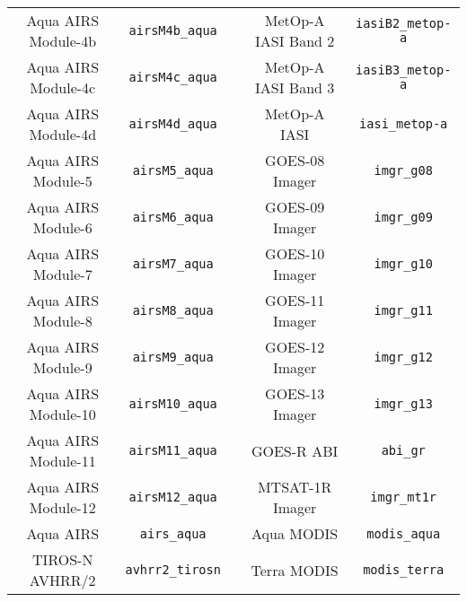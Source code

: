 \begin{table}[htp]
\begin{tabular}{c c c c c}
Aqua AIRS Module-4b & \texttt{airsM4b\_aqua}       & \hspace{0.2cm} & MetOp-A IASI Band 2 & \texttt{iasiB2\_metop-a}            \\
Aqua AIRS Module-4c & \texttt{airsM4c\_aqua}       & \hspace{0.2cm} & MetOp-A IASI Band 3 & \texttt{iasiB3\_metop-a}            \\
Aqua AIRS Module-4d & \texttt{airsM4d\_aqua}       & \hspace{0.2cm} & MetOp-A IASI & \texttt{iasi\_metop-a}                     \\
Aqua AIRS Module-5  & \texttt{airsM5\_aqua}        & \hspace{0.2cm} & GOES-08 Imager & \texttt{imgr\_g08}                       \\
Aqua AIRS Module-6  & \texttt{airsM6\_aqua}        & \hspace{0.2cm} & GOES-09 Imager & \texttt{imgr\_g09}                       \\
Aqua AIRS Module-7  & \texttt{airsM7\_aqua}        & \hspace{0.2cm} & GOES-10 Imager & \texttt{imgr\_g10}                       \\
Aqua AIRS Module-8  & \texttt{airsM8\_aqua}        & \hspace{0.2cm} & GOES-11 Imager & \texttt{imgr\_g11}                       \\
Aqua AIRS Module-9  & \texttt{airsM9\_aqua}        & \hspace{0.2cm} & GOES-12 Imager & \texttt{imgr\_g12}                       \\
Aqua AIRS Module-10 & \texttt{airsM10\_aqua}       & \hspace{0.2cm} & GOES-13 Imager & \texttt{imgr\_g13}                       \\
Aqua AIRS Module-11 & \texttt{airsM11\_aqua}       & \hspace{0.2cm} & GOES-R ABI & \texttt{abi\_gr}                             \\
Aqua AIRS Module-12 & \texttt{airsM12\_aqua}       & \hspace{0.2cm} & MTSAT-1R Imager & \texttt{imgr\_mt1r}                     \\
Aqua AIRS & \texttt{airs\_aqua}                    & \hspace{0.2cm} & Aqua MODIS & \texttt{modis\_aqua}                         \\
TIROS-N AVHRR/2 & \texttt{avhrr2\_tirosn}          & \hspace{0.2cm} & Terra MODIS & \texttt{modis\_terra}                       \\

\end{tabular}
\end{table}
